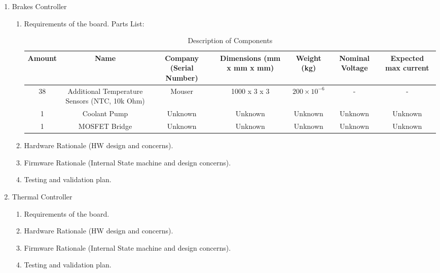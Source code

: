 \begin{enumerate}
    \item Brakes Controller
    \begin{enumerate}
        \item Requirements of the board.
        Parts List:
            \begin{table}[h]
                \centering
                \begin{tabular}{|c|c|c|c|c|c|c|}
                \hline
                \textbf{Amount} & \textbf{Name} & \textbf{Company (Serial Number)} & \textbf{Dimensions (mm x mm x mm)} & \textbf{Weight (kg)} & \textbf{Nominal Voltage} & \textbf{Expected max current} \\
                \hline
                38 & Additional Temperature Sensors (NTC, 10k Ohm) & Mouser & 1000 x 3 x 3 & $200 \times 10^{-6}$ & - & - \\
                \hline
                1 & Coolant Pump & Unknown & Unknown & Unknown & Unknown & Unknown \\
                \hline
                1 & MOSFET Bridge & Unknown & Unknown & Unknown & Unknown & Unknown \\
                \hline
                \end{tabular}
                \caption{Description of Components}
                \label{tab:components}
            \end{table}
        \item Hardware Rationale (HW design and concerns).

        \item Firmware Rationale (Internal State machine and design concerns).

        \item Testing and validation plan.


    \end{enumerate}

    \item Thermal Controller
        \begin{enumerate}
            \item Requirements of the board.

            \item Hardware Rationale (HW design and concerns).

            \item Firmware Rationale (Internal State machine and design concerns).

            \item Testing and validation plan.
        \end{enumerate}


\end{enumerate}
